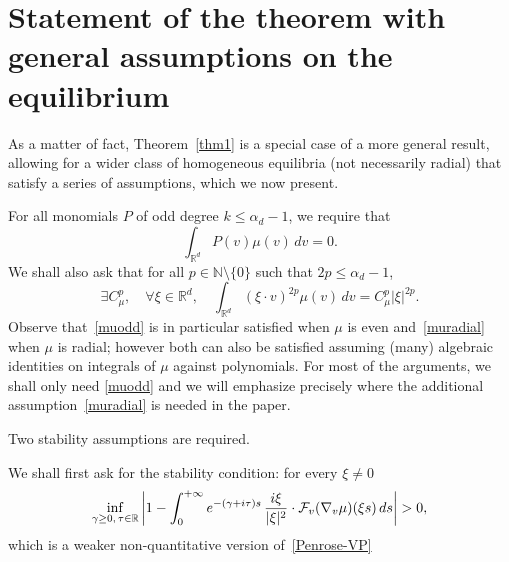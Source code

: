 \documentclass[11pt]{amsart}
\numberwithin{equation}{section}
\newcommand{\R}{\mathbb{R}}
\newcommand{\N}{\mathbb{N}}
\newcommand{\na}{\nabla}
\begin{document}
\section{Statement of the theorem with general assumptions on the equilibrium}

As a matter of fact, Theorem~\ref{thm1} is a special case of a more general result, allowing for a wider class of homogeneous equilibria
(not necessarily radial)
that satisfy a series of assumptions, which we now present.

\bigskip

 For all monomials $P$ of  odd degree $k \leq \alpha_d-1$,
we require that
\begin{equation}
\label{muodd}
\int_{\R^d} P(v) \mu(v) \, dv =0.
\end{equation}
We shall also ask that for all  $p \in \N\setminus\{0\}$ such that $2 p\leq  \alpha_d-1$, 
\begin{equation}
\label{muradial}
\exists C_{\mu}^p, \quad \forall \xi \in \R^d, \quad \int_{\mathbb{R}^d}  (\xi \cdot v)^{2p} \mu(v)\, dv  = C_\mu^p |\xi|^{2p}.
\end{equation}
Observe that~\eqref{muodd} is in particular satisfied when $\mu$ is even and~\eqref{muradial} when $\mu$ is radial; however both can also be satisfied assuming (many) algebraic identities on integrals of $\mu$ against polynomials.
 For most of the arguments, we shall  only need \eqref{muodd} and
 we will emphasize precisely where the additional assumption~\eqref{muradial} is needed in the paper.
 

\bigskip


 Two stability assumptions are required.

 We shall  first ask for the stability condition: for every $\xi \neq 0$
\begin{equation}
\label{Penrose-VP-awayfrom0}
\inf_{\gamma \geq 0, \, \tau \in \R} \left| 1   -  \int_{0}^{+ \infty} e^{-(\gamma + i \tau)s}\, {i \xi \over  |\xi|^2}\cdot  \mathcal{F}_v( \na_v \mu)(\xi s) \, d s \right|>0,
\end{equation}
which is a weaker non-quantitative version of~\eqref{Penrose-VP} 
\end{document}
